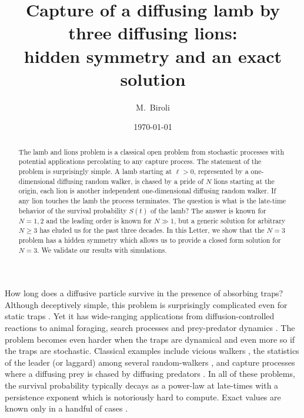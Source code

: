 \documentclass[aps,prl,twocolumn,superscriptaddress,floatfix,nofootinbib]{revtex4-2}
\begin{document}
\title{Capture of a diffusing lamb by three diffusing lions:\\
hidden symmetry and an exact solution}

\author{M.~Biroli}

\date{\today}

\begin{abstract}
    The lamb and lions problem is a classical open problem from stochastic processes with potential applications percolating to any capture process. The statement of the problem is surprisingly simple. A lamb starting at $\ell > 0$, represented by a one-dimensional diffusing random walker, is chased by a pride of $N$ lions starting at the origin, each lion is another independent one-dimensional diffusing random walker. If any lion touches the lamb the process terminates. The question is what is the late-time behavior of the survival probability $S(t)$ of the lamb? The answer is known for $N = 1, 2$ and the leading order is known for $N \gg 1$, but a generic solution for arbitrary $N \geq 3$ has eluded us for the past three decades. In this Letter, we show that the $N = 3$ problem has a hidden symmetry which allows us to provide a closed form solution for $N = 3$. We validate our results with simulations. 
\end{abstract}

\maketitle

How long does a diffusive particle survive in the presence of absorbing traps? Although deceptively simple, this problem is surprisingly complicated even for static traps \cite{RednerBook,BMS13}. Yet it has wide-ranging applications from diffusion-controlled reactions to animal foraging, search processes and prey-predator dynamics \cite{BLMV11,MOR14}. The problem becomes even harder when the traps are dynamical and even more so if the traps are stochastic. Classical examples include vicious walkers \cite{Fisher84,HF84}, the statistics of the leader (or laggard) among several random-walkers \cite{bA03,BNK10a,BNK10b,HbA18}, and capture processes where a diffusing prey is chased by diffusing predators \cite{BG91,KR96,RK99,GMPR12}. In all of these problems, the survival probability typically decays as a power-law at late-times with a persistence exponent which is notoriously hard to compute. Exact values are known only in a handful of cases \cite{BMS13,DHP95,MSBC96,DHZ96,PS18}.\\
\end{document}
